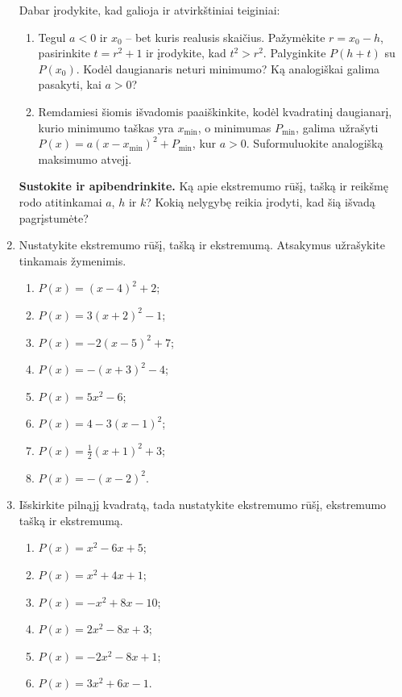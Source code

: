 \documentclass[12pt,a4paper]{article}
\begin{document}
\begin{enumerate}
Dabar įrodykite, kad galioja ir atvirkštiniai teiginiai:
\begin{enumerate}[start=3]
\item Tegul $a<0$ ir $x_0$ – bet kuris realusis skaičius. Pažymėkite $r=x_0-h$, pasirinkite $t=r^2+1$ ir įrodykite, kad $t^2>r^2$. Palyginkite $P(h+t)$ su $P(x_0)$. Kodėl daugianaris neturi minimumo? Ką analogiškai galima pasakyti, kai $a>0$?
\item Remdamiesi šiomis išvadomis paaiškinkite, kodėl kvadratinį daugianarį, kurio minimumo taškas yra $x_{\min}$, o minimumas $P_{\min}$, galima užrašyti $P(x)=a(x-x_{\min})^2+P_{\min}$, kur $a>0$. Suformuluokite analogišką maksimumo atvejį.
\end{enumerate}
\par\medskip
\textbf{Sustokite ir apibendrinkite.} Ką apie ekstremumo rūšį, tašką ir reikšmę rodo atitinkamai $a$, $h$ ir $k$? Kokią nelygybę reikia įrodyti, kad šią išvadą pagrįstumėte?
\item Nustatykite ekstremumo rūšį, tašką ir ekstremumą. Atsakymus užrašykite tinkamais žymenimis.
\begin{multicols}{2}\begin{enumerate}
\item $P(x)=(x-4)^2+2$;
\item $P(x)=3(x+2)^2-1$;
\item $P(x)=-2(x-5)^2+7$;
\item $P(x)=-(x+3)^2-4$;
\item $P(x)=5x^2-6$;
\item $P(x)=4-3(x-1)^2$;
\item $P(x)=\frac{1}{2}(x+1)^2+3$;
\item $P(x)=-(x-2)^2$.
\end{enumerate}\end{multicols}
\item Išskirkite pilnąjį kvadratą, tada nustatykite ekstremumo rūšį, ekstremumo tašką ir ekstremumą.
\begin{multicols}{2}\begin{enumerate}
\item $P(x)=x^2-6x+5$;
\item $P(x)=x^2+4x+1$;
\item $P(x)=-x^2+8x-10$;
\item $P(x)=2x^2-8x+3$;
\item $P(x)=-2x^2-8x+1$;
\item $P(x)=3x^2+6x-1$.
\end{enumerate}\end{multicols}

\end{enumerate}
\end{document}
